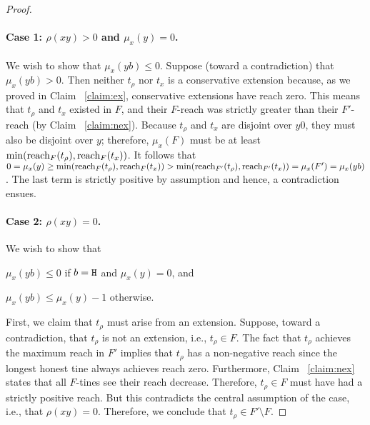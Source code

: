 \begin{proof}
  \paragraph{Case 1: $\rho(xy)>0$ and $\mu_x(y)=0$.} 
    We wish to show that $\mu_x(yb) \leq 0$.
    Suppose (toward a contradiction) that $\mu_x(yb) > 0$. 
    Then neither $t_\rho$ nor $t_x$ is a conservative extension because, as we proved in Claim ~\ref{claim:ex}, conservative extensions have reach zero. This means that $t_\rho$ and $t_x$ existed in $F$, and their $F$-reach was strictly greater than their $F'$-reach (by Claim ~\ref{claim:nex}). 
    Because $t_\rho$ and $t_x$ 
    are 
    disjoint over $y0$, they must also be disjoint over $y$; therefore, $\mu_x(F)$ must be at least $\min(\operatorname{reach}_F(t_\rho),\operatorname{reach}_F(t_x))$. 
    It follows that 
    $0 
    = \mu_x(y) 
    \geq \min(\operatorname{reach}_F(t_\rho),\operatorname{reach}_F(t_x))
    > \min(\operatorname{reach}_{F'}(t_\rho),\operatorname{reach}_{F'}(t_x))
    = \mu_x(F') = \mu_x(yb)
    $. 
    The last term is strictly positive by assumption and hence, a contradiction ensues.

  \paragraph{Case 2: $\rho(xy)=0$.}
    We wish to show that 
    \begin{enumerate*}[label=(\textit{\roman*})]
      \item $\mu_x(yb) \leq 0$ if $b = \mathtt{H}$ and $\mu_x(y) = 0$, and 
      \item $\mu_x(yb) \leq \mu_x(y) - 1$ otherwise.
    \end{enumerate*}
    First, we claim that $t_\rho$ must arise from an extension. 
    Suppose, toward a contradiction, that $t_\rho$ is not an extension, 
    i.e., $t_\rho \in F$. 
    The fact that $t_\rho$ achieves the maximum reach in $F'$ 
    implies that 
    $t_\rho$ has a non-negative reach 
    since the longest honest tine always achieves reach zero. 
    Furthermore, 
    Claim ~\ref{claim:nex} states that 
    all $F$-tines see their reach decrease. 
    Therefore, $t_\rho \in F$ must have had a strictly positive reach. 
    But this contradicts the central assumption of the case, i.e., 
    that $\rho(xy)=0$. 
    Therefore, we conclude that $t_\rho \in F' \setminus F$.


\end{proof}
